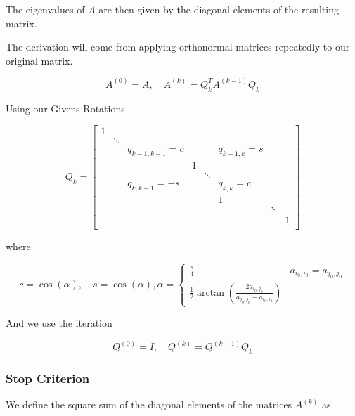 The eigenvalues of \(A\) are then given by the diagonal elements of the resulting matrix.

The derivation will come from applying orthonormal matrices repeatedly to our original matrix. 

\[
    A^{(0)} = A, \quad A^{(k)} = Q_k^T A^{(k - 1)} Q_k
\]

Using our Givens-Rotations 

\[
    Q_k = 
    \begin{bmatrix}
        1 &        &    &         &        &        &         &   \\
          & \ddots &    &         &        &        &         &   \\
          &        & q_{k - 1, k - 1} = c  &         &        &   q_{k - 1, k} = s    &         &   \\
          &        &    &   1     &        &        &         &   \\
          &        &    &         & \ddots &        &         &   \\
          &        & q_{k, k - 1} = -s &         &        &   q_{k, k} = c    &         &   \\
          &        &    &         &        &   1    &         &   \\
          &        &    &         &        &        & \ddots  &   \\
          &        &    &         &        &        &         & 1 \\
    \end{bmatrix}
\]


where 


\[
   c = \cos(\alpha), \quad s = \cos(\alpha), \alpha = 
   \begin{cases}
    \frac{\pi}{4}  & a_{i_0, i_0} = a_{j_0, j_0} \\ 
    \frac{1}{2}\arctan\left(\frac{2a_{i_0, j_0}}{a_{j_0, j_0} - a_{i_0, i_0}}\right)
   \end{cases} 
\]

And we use the iteration 

\[
    Q^{(0)} = I, \quad Q^{(k)} = Q^{(k - 1)}Q_k
\]

\subsubsection{Stop Criterion}

We define the square sum of the diagonal elements of the matrices \(A^{(k)}\) as 

